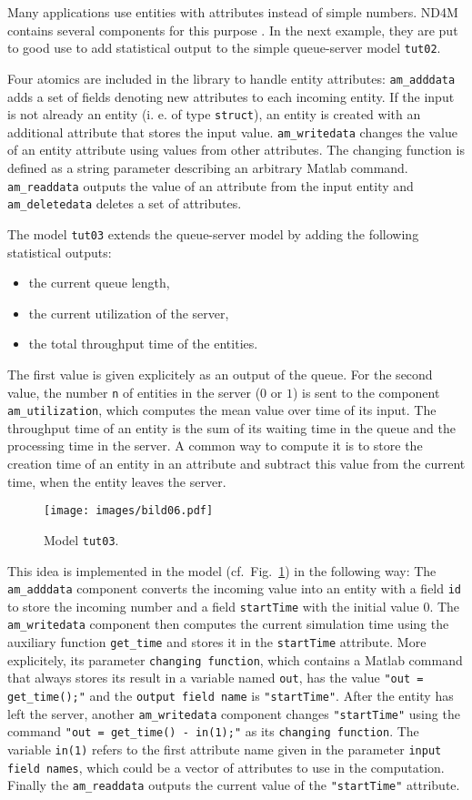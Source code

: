 \documentclass[12pt,oneside,a4paper,bibtotoc,BCOR=0pt,DIV=20]{scrreprt}
\newcommand{\cft}[1]{\mbox{\texttt{#1}}}   %
\begin{document}
Many applications use entities with attributes instead of simple numbers. ND4M
contains several components for this purpose \cite{nsaInvitation}. In the next
example, they are put to good use to add statistical output to the simple
queue-server model \cft{tut02}.

Four atomics are included in the library to handle entity attributes:
\cft{am\_adddata} adds a set of fields denoting new attributes to each incoming
entity. If the input is not already an entity (i. e. of type \cft{struct}), an
entity is created with an additional attribute that stores the input
value. \cft{am\_writedata} changes the value of an entity attribute using
values from other attributes. The changing function is defined as a string
parameter describing an arbitrary Matlab command. \cft{am\_readdata} outputs
the value of an attribute from the input entity and \cft{am\_deletedata}
deletes a set of attributes.

The model \cft{tut03} extends the queue-server model by adding the following
statistical outputs:
\begin{itemize}
\item the current queue length,
\item the current utilization of the server,
\item the total throughput time of the entities.
\end{itemize}
The first value is given explicitely as an output of the queue. For the second
value, the number \cft{n} of entities in the server ($0$ or $1$) is sent to the
component \cft{am\_utilization}, which computes the mean value over time of its
input. The throughput time of an entity is the sum of its waiting time in the
queue and the processing time in the server. A common way to compute it is to
store the creation time of an entity in an attribute and subtract this value
from the current time, when the entity leaves the server.
\begin{figure}[ht]
\centering
\texttt{[image: images/bild06.pdf]}
\caption{Model \cft{tut03}.}
\label{fig_6}
\end{figure}

This idea is implemented in the model (cf.\ Fig.\ \ref{fig_6}) in the following
way: The \cft{am\_adddata} component converts the incoming value into an entity
with a field \cft{id} to store the incoming number and a field \cft{startTime}
with the initial value $0$. The \cft{am\_writedata} component then computes the
current simulation time using the auxiliary function \cft{get\_time} and stores
it in the \cft{startTime} attribute. More explicitely, its parameter
\cft{changing function}, which contains a Matlab command that always stores its
result in a variable named \cft{out}, has the value \cft{"out = get\_time();"}
and the \cft{output field name} is \cft{"startTime"}. After the entity has left
the server, another \cft{am\_writedata} component changes \cft{"startTime"}
using the command \cft{"out = get\_time() - in(1);"} as its \cft{changing
  function}. The variable \cft{in(1)} refers to the first attribute name given
in the parameter \cft{input field names}, which could be a vector of attributes
to use in the computation. Finally the \cft{am\_readdata} outputs the current
value of the \cft{"startTime"} attribute.
\end{document}
